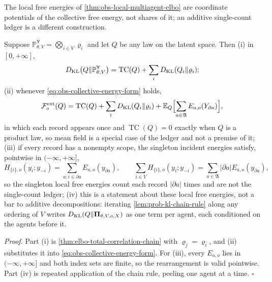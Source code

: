The local free energies of \cref{thm:obs-local-multiagent-elbo} are coordinate
potentials of the collective free energy, not shares of it; an additive
single-count ledger is a different construction.

Suppose $\mathbb P^{\mathsf Y}_{\theta,V}=\bigotimes_{i\in V}\varrho_i$ and let
$Q$ be any law on the latent space. Then (i) in $[0,+\infty]$,
\begin{equation}
D_{\mathrm{KL}}\bigl(Q\Vert\mathbb P^{\mathsf Y}_{\theta,V}\bigr)
=\operatorname{TC}(Q)+\sum_iD_{\mathrm{KL}}(Q_i\Vert\varrho_i);
\label{eq:obs-correlated-complexity-ledger}
\end{equation}
(ii) whenever \eqref{eq:obs-collective-energy-form} holds,
\begin{equation}
\mathcal F^{\mathrm{ext}}_o(Q)
=\operatorname{TC}(Q)+\sum_iD_{\mathrm{KL}}(Q_i\Vert\varrho_i)
+\mathbb E_Q\Bigl[\sum_{a\in\mathfrak A}E_{a,o}(Y_{\partial a})\Bigr],
\label{eq:obs-global-ledger}
\end{equation}
in which each record appears once and $\operatorname{TC}(Q)=0$ exactly when $Q$
is a product law, so mean field is a special case of the ledger and not a
premise of it; (iii) if every record has a nonempty scope, the singleton
incident energies satisfy, pointwise in $(-\infty,+\infty]$,
\begin{equation}
H_{\{i\},o}(y_i;y_{-i})=\sum_{a:i\in\partial a}E_{a,o}(y_{\partial a}),
\qquad
\sum_{i\in V}H_{\{i\},o}(y_i;y_{-i})=\sum_{a\in\mathfrak A}\lvert\partial a\rvert E_{a,o}(y_{\partial a}),
\label{eq:obs-singleton-incident-counting}
\end{equation}
so the singleton local free energies count each record $\lvert\partial a\rvert$
times and are not the single-count ledger; (iv) this is a statement about these
local free energies, not a bar to additive decompositions: iterating
\cref{lem:prob-kl-chain-rule} along any ordering of $V$ writes
$D_{\mathrm{KL}}(Q\Vert\boldsymbol\Pi_{\theta,V,o,X})$ as one term per agent, each
conditioned on the agents before it. 

\noindent\emph{Proof.}
Part (i) is \cref{thm:elbo-total-correlation-chain} with
$\varrho_j=\varrho_i$, and (ii) substitutes it into
\eqref{eq:obs-collective-energy-form}. For (iii), every $E_{a,o}$ lies in
$(-\infty,+\infty]$ and both index sets are finite, so the rearrangement is
valid pointwise. Part (iv) is repeated application of the chain rule, peeling
one agent at a time. \hfill$\square$

